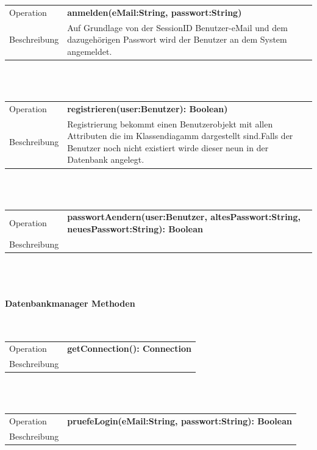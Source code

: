 \documentclass[12pt,a4paper]{article}
\begin{document}
\begin{tabular}{|lp{12cm}|}
	\hline
	Operation &  \textbf{anmelden(eMail:String, passwort:String) }\\ 
	Beschreibung & Auf Grundlage von der SessionID Benutzer-eMail und dem dazugehörigen Passwort wird der Benutzer an dem System angemeldet.\\ 
	\hline 
\end{tabular} \\\\

\begin{tabular}{|lp{12cm}|}
	\hline
	Operation &  \textbf{registrieren(user:Benutzer): Boolean) }\\ 
	Beschreibung & Registrierung bekommt einen Benutzerobjekt mit allen Attributen die im Klassendiagamm dargestellt sind.Falls der Benutzer noch nicht existiert wirde dieser neun in der Datenbank angelegt. \\ 
	\hline 
\end{tabular} \\\\

\begin{tabular}{|lp{12cm}|}
	\hline
	Operation &  \textbf{passwortAendern(user:Benutzer, altesPasswort:String, neuesPasswort:String): Boolean }\\ 
	Beschreibung & \\ 
	\hline 
\end{tabular} \\\\


\paragraph{Datenbankmanager  Methoden}\mbox{}\\

\begin{tabular}{|lp{12cm}|}
	\hline
	Operation &  \textbf{getConnection(): Connection}\\ 
	Beschreibung & \\ 
	\hline 
\end{tabular} \\\\

\begin{tabular}{|lp{12cm}|}
	\hline
	Operation &  \textbf{pruefeLogin(eMail:String, passwort:String): Boolean}\\ 
	Beschreibung & \\ 
	\hline 
\end{tabular} \\\\
\end{document}
